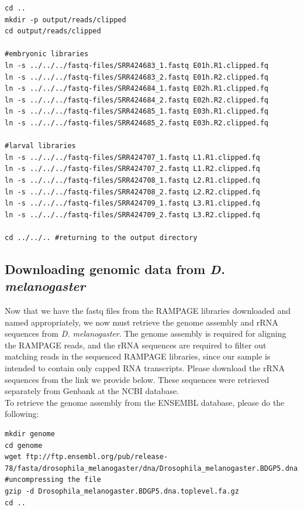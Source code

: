 \documentclass[runningheads,a4paper]{llncs}
\begin{document}
\begin{linenumbers}
\noindent
\begin{verbatim}
cd ..
mkdir -p output/reads/clipped
cd output/reads/clipped

#embryonic libraries
ln -s ../../../fastq-files/SRR424683_1.fastq E01h.R1.clipped.fq 
ln -s ../../../fastq-files/SRR424683_2.fastq E01h.R2.clipped.fq
ln -s ../../../fastq-files/SRR424684_1.fastq E02h.R1.clipped.fq
ln -s ../../../fastq-files/SRR424684_2.fastq E02h.R2.clipped.fq
ln -s ../../../fastq-files/SRR424685_1.fastq E03h.R1.clipped.fq
ln -s ../../../fastq-files/SRR424685_2.fastq E03h.R2.clipped.fq

#larval libraries
ln -s ../../../fastq-files/SRR424707_1.fastq L1.R1.clipped.fq 
ln -s ../../../fastq-files/SRR424707_2.fastq L1.R2.clipped.fq
ln -s ../../../fastq-files/SRR424708_1.fastq L2.R1.clipped.fq
ln -s ../../../fastq-files/SRR424708_2.fastq L2.R2.clipped.fq
ln -s ../../../fastq-files/SRR424709_1.fastq L3.R1.clipped.fq
ln -s ../../../fastq-files/SRR424709_2.fastq L3.R2.clipped.fq

cd ../../.. #returning to the output directory
\end{verbatim}

\subsection{Downloading genomic data from \textit{D. melanogaster}}
Now that we have the fastq files from the RAMPAGE libraries downloaded and named appropriately, we now must retrieve the genome assembly and rRNA sequences from \textit{D. melanogaster}.
The genome assembly is required for aligning the RAMPAGE reads, and the rRNA sequences are required to filter out matching reads in the sequenced RAMPAGE libraries, since our sample is intended to contain only capped RNA transcripts. 
Please download the rRNA sequences from the link we provide below. 
These sequences were retrieved separately from Genbank at the NCBI database. \\

\noindent
To retrieve the genome assembly from the ENSEMBL database, please do the following:

\noindent
\begin{verbatim}
mkdir genome
cd genome
wget ftp://ftp.ensembl.org/pub/release-78/fasta/drosophila_melanogaster/dna/Drosophila_melanogaster.BDGP5.dna.toplevel.fa.gz
#uncompressing the file
gzip -d Drosophila_melanogaster.BDGP5.dna.toplevel.fa.gz
cd ..
\end{verbatim}


\end{linenumbers}
\end{document}
